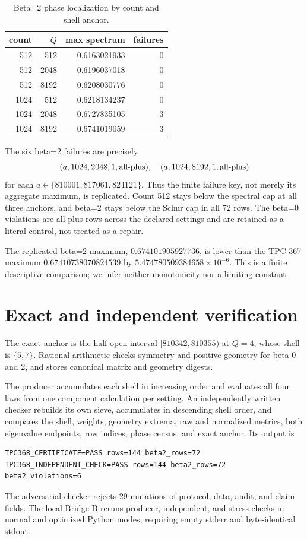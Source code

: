 \documentclass[10pt]{article}
\begin{document}
\begin{table}[t]
\centering
\caption{Beta=2 phase localization by count and shell anchor.}
\label{tab:phase}
\small
\begin{tabular}{r r r r}
\toprule
count & $Q$ & max spectrum & failures\\
\midrule
512  & 512  & 0.6163021933 & 0\\
512  & 2048 & 0.6196037018 & 0\\
512  & 8192 & 0.6208030776 & 0\\
1024 & 512  & 0.6218134237 & 0\\
1024 & 2048 & 0.6727835105 & 3\\
1024 & 8192 & 0.6741019059 & 3\\
\bottomrule
\end{tabular}
\end{table}

The six beta=2 failures are precisely
\begin{equation*}
(a,1024,2048,1,\mathrm{all\mathchar`-plus}),\quad
(a,1024,8192,1,\mathrm{all\mathchar`-plus})
\end{equation*}
for each $a\in\{810001,817061,824121\}$.  Thus the finite failure key,
not merely its aggregate maximum, is replicated.  Count 512 stays below the
spectral cap at all three anchors, and beta=2 stays below the Schur cap in
all 72 rows.  The beta=0 violations are all-plus rows across the declared
settings and are retained as a literal control, not treated as a repair.

The replicated beta=2 maximum, $0.674101905927736$, is lower than the
TPC-367 maximum $0.67410738070824539$ by
$5.474780509384658\times10^{-6}$.  This is a finite descriptive comparison;
we infer neither monotonicity nor a limiting constant.

\section{Exact and independent verification}

The exact anchor is the half-open interval $[810342,810355)$ at $Q=4$,
whose shell is $\{5,7\}$.  Rational arithmetic checks symmetry and positive
geometry for beta 0 and 2, and stores canonical matrix and geometry digests.

The producer accumulates each shell in increasing order and evaluates all
four laws from one component calculation per setting.  An independently
written checker rebuilds its own sieve, accumulates in descending shell
order, and compares the shell, weights, geometry extrema, raw and normalized
metrics, both eigenvalue endpoints, row indices, phase census, and exact
anchor.  Its output is
\begin{verbatim}
TPC368_CERTIFICATE=PASS rows=144 beta2_rows=72
TPC368_INDEPENDENT_CHECK=PASS rows=144 beta2_rows=72 beta2_violations=6
\end{verbatim}
The adversarial checker rejects 29 mutations of protocol, data, audit, and
claim fields.  The local Bridge-B reruns producer, independent, and stress
checks in normal and optimized Python modes, requiring empty stderr and
byte-identical stdout.
\end{document}
